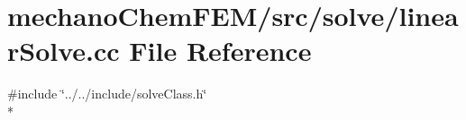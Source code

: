 \section{mechano\-Chem\-F\-E\-M/src/solve/linear\-Solve.cc File Reference}
\label{linear_solve_8cc}
{\ttfamily \#include \char`\"{}../../include/solve\-Class.\-h\char`\"{}}\\*
